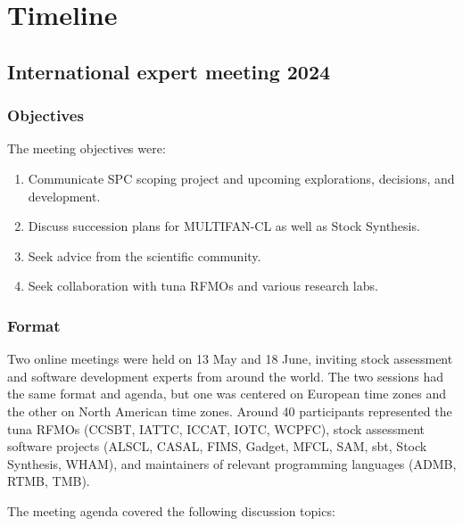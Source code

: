 \documentclass{SCreport}
\begin{document}
\section{Timeline}

\subsection{International expert meeting 2024}

\subsubsection{Objectives}

The meeting objectives were:

\begin{enumerate}
  \item Communicate SPC scoping project and upcoming explorations, decisions,
  and development.
  \item Discuss succession plans for MULTIFAN-CL as well as Stock Synthesis.
  \item Seek advice from the scientific community.
  \item Seek collaboration with tuna RFMOs and various research labs.
\end{enumerate}

\subsubsection{Format}

Two online meetings were held on 13 May and 18 June, inviting stock assessment
and software development experts from around the world. The two sessions had the
same format and agenda, but one was centered on European time zones and the
other on North American time zones. Around 40 participants represented the tuna
RFMOs (CCSBT, IATTC, ICCAT, IOTC, WCPFC), stock assessment software projects
(ALSCL, CASAL, FIMS, Gadget, MFCL, SAM, sbt, Stock Synthesis, WHAM), and
maintainers of relevant programming languages (ADMB, RTMB, TMB).

The meeting agenda covered the following discussion topics:
\end{document}

